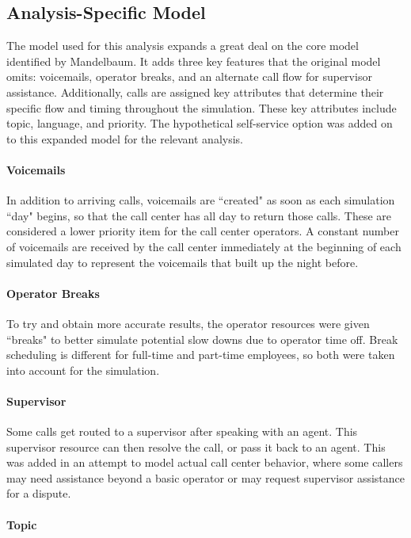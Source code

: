 \documentclass[12pt,twocolumn]{article}
\begin{document}
\subsection{Analysis-Specific Model}
The model used for this analysis expands a great deal on the core model identified by Mandelbaum.  It adds three key features that the original model omits: voicemails, operator breaks, and an alternate call flow for supervisor assistance.  Additionally, calls are assigned key attributes that determine their specific flow and timing throughout the simulation.  These key attributes include topic, language, and priority.  The hypothetical self-service option was added on to this expanded model for the relevant analysis.

	\paragraph{Voicemails}
	
In addition to arriving calls, voicemails are ``created" as soon as each simulation ``day" begins, so that the call center has all day to return those calls.  These are considered a lower priority item for the call center operators.  A constant number of voicemails are received by the call center immediately at the beginning of each simulated day to represent the voicemails that built up the night before.

	\paragraph{Operator Breaks}
	
To try and obtain more accurate results, the operator resources were given ``breaks" to better simulate potential slow downs due to operator time off. Break scheduling is different for full-time and part-time employees, so both were taken into account for the simulation.

	\paragraph{Supervisor}
	
Some calls get routed to a supervisor after speaking with an agent.  This supervisor resource can then resolve the call, or pass it back to an agent.  This was added in an attempt to model actual call center behavior, where some callers may need assistance beyond a basic operator or may request supervisor assistance for a dispute. 

	\paragraph{Topic}
\end{document}
